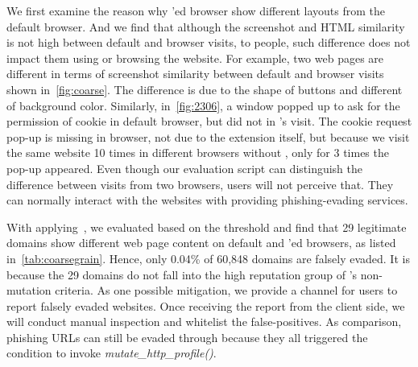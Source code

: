 We first examine the reason why \spartacus'ed browser show different layouts from the default browser.
And we find that although the screenshot and HTML similarity is not high between default and \spartacus browser visits,
to people, such difference does not impact them using or browsing the website.
For example, two web pages are different in terms of screenshot similarity between default and \spartacus browser visits shown in~\autoref{fig:coarse}.
The difference is due to the shape of buttons and different of background color.
Similarly, in~\autoref{fig:2306}, a window popped up to ask for the permission of cookie in default browser, but did not in \spartacus's visit.
The cookie request pop-up is missing in \spartacus browser, not due to the extension itself, but because we visit the same website 10 times in different browsers without \spartacus, only for 3 times the pop-up appeared.
Even though our evaluation script can distinguish the difference between visits from two browsers,
users will not perceive that.
They can normally interact with the websites with \spartacus providing phishing-evading services.




With applying~, we evaluated \spartacus based on the threshold and find that 29 legitimate domains show different web page content on default and \spartacus'ed browsers, as listed in~\autoref{tab:coarsegrain}.
Hence, only 0.04\% of 60,848 domains are falsely evaded.
It is because the 29 domains do not fall into the high reputation group of \spartacus's non-mutation criteria.
As one possible mitigation, we provide a channel for users to report falsely evaded websites.
Once receiving the report from the client side, we will conduct manual inspection and whitelist the false-positives.
As comparison, phishing URLs can still be evaded through \spartacus because they all triggered the condition to invoke \emph{mutate\_http\_profile()}.


